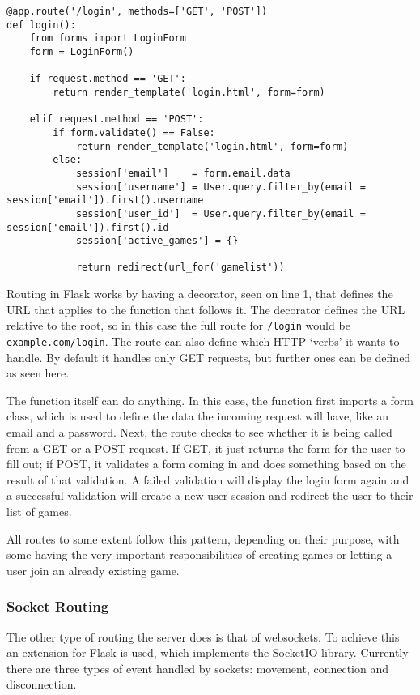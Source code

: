 \noindent
\begin{minipage}{\linewidth}
\begin{lstlisting}[style=py, caption={Route for handling logins on the server-side.}, label=login_route]
@app.route('/login', methods=['GET', 'POST'])
def login():
    from forms import LoginForm
    form = LoginForm()

    if request.method == 'GET':
        return render_template('login.html', form=form)

    elif request.method == 'POST':
        if form.validate() == False:
            return render_template('login.html', form=form)
        else:
            session['email']    = form.email.data
            session['username'] = User.query.filter_by(email = session['email']).first().username
            session['user_id']  = User.query.filter_by(email = session['email']).first().id
            session['active_games'] = {}

            return redirect(url_for('gamelist'))
\end{lstlisting}
\end{minipage}

Routing in Flask works by having a decorator, seen on line 1, that defines the URL that applies to the function that follows it. The decorator defines the URL relative to the root, so in this case the full route for \texttt{/login} would be \texttt{example.com/login}. The route can also define which HTTP `verbs' it wants to handle. By default it handles only GET requests, but further ones can be defined as seen here.

The function itself can do anything. In this case, the function first imports a form class, which is used to define the data the incoming request will have, like an email and a password. Next, the route checks to see whether it is being called from a GET or a POST request. If GET, it just returns the form for the user to fill out; if POST, it validates a form coming in and does something based on the result of that validation. A failed validation will display the login form again and a successful validation will create a new user session and redirect the user to their list of games.

All routes to some extent follow this pattern, depending on their purpose, with some having the very important responsibilities of creating games or letting a user join an already existing game.

\subsubsection{Socket Routing}
The other type of routing the server does is that of websockets. To achieve this an extension for Flask is used, which implements the SocketIO library. Currently there are three types of event handled by sockets: movement, connection and disconnection.

